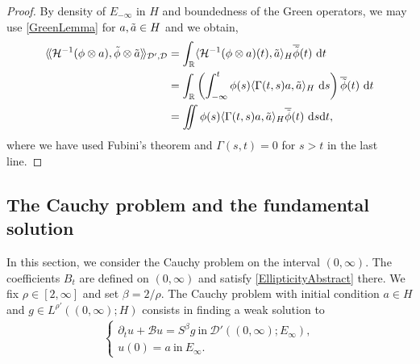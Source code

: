 \documentclass[11pt, letterpaper]{amsart}
\theoremstyle{definition}
\theoremstyle{remark}
\newcommand{\llangle}{\langle\!\langle}
\newcommand{\rrangle}{\rangle\!\rangle}
\numberwithin{equation}{section}
\begin{document}
\begin{proof}
By density of $E_{-\infty}$ in $H$ and boundedness of the Green operators, we may use \eqref{GreenLemma} for $a,\Tilde{a}\in H$ and we obtain,
\begin{align*}
     \llangle \mathcal{H}^{-1}(\phi  \otimes a), \Tilde{\phi}\otimes \Tilde{a} \rrangle_{\mathcal{D}', \mathcal{D}} &= \int_{\mathbb{R}} \langle \mathcal{H}^{-1}(\phi  \otimes a)(t), \Tilde{a} \rangle_H \overline{\Tilde{\phi}}(t)\ \mathrm{d}t
     \\& = \int_{\mathbb{R}} \left ( \int_{-\infty}^{t} \phi(s) \langle \Gamma(t,s)a,\Tilde{a}\rangle_H \ \mathrm ds \right ) \overline{\Tilde{\phi}}(t)\ \mathrm{d}t
     \\& = \iint \phi(s) \langle \Gamma(t,s)a,  \Tilde{a} \rangle_H \overline{\Tilde{\phi}}(t) \ \mathrm d s\mathrm d t,
\end{align*}
where we have used Fubini's theorem  and $\Gamma(s,t)=0$ for $s>t$ in the last line. 
\end{proof}
\subsection{The Cauchy problem and the fundamental solution}
In this section, we consider the Cauchy problem on the interval $(0,\infty)$. The coefficients $B_t$ are defined on $(0,\infty)$ and satisfy \eqref{EllipticityAbstract} there.  We fix $\rho \in [2,\infty]$ and  set $\beta={2}/{\rho}$. The Cauchy problem  with initial condition $a\in H$ and  
$g\in L^{\rho'}((0,\infty);H)$ consists in finding a weak solution to
\begin{align}\label{Pb Cauchy homogène}
\left\{
    \begin{array}{ll}
         \partial_t u +\mathcal{B}u = S^\beta g   \ \mathrm{in} \ \mathcal{D}'((0,\infty);E_\infty), \\
        u(0)=a \  \mathrm{in} \ E_\infty.
    \end{array}
\right.
\end{align}
\end{document}
